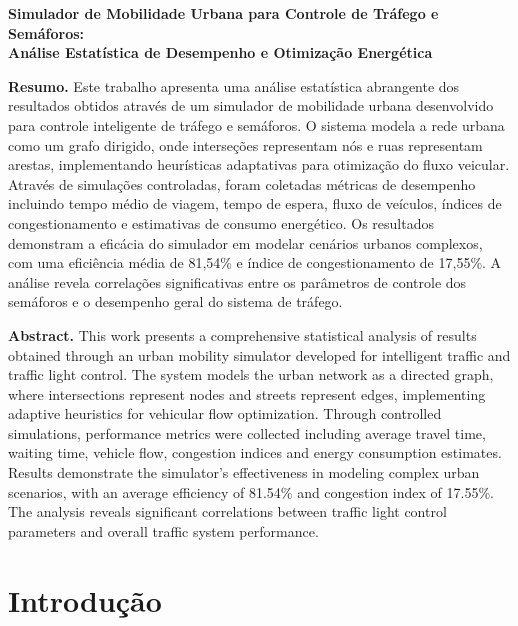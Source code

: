 \documentclass[12pt,a4paper]{article}
\begin{document}
\begin{center}
{\fontsize{12}{14.4}\selectfont\bfseries
Simulador de Mobilidade Urbana para Controle de Tráfego e Semáforos: \\
Análise Estatística de Desempenho e Otimização Energética}
\end{center}

\vspace{12pt}

\noindent\textbf{Resumo.} Este trabalho apresenta uma análise estatística abrangente dos resultados obtidos através de um simulador de mobilidade urbana desenvolvido para controle inteligente de tráfego e semáforos. O sistema modela a rede urbana como um grafo dirigido, onde interseções representam nós e ruas representam arestas, implementando heurísticas adaptativas para otimização do fluxo veicular. Através de simulações controladas, foram coletadas métricas de desempenho incluindo tempo médio de viagem, tempo de espera, fluxo de veículos, índices de congestionamento e estimativas de consumo energético. Os resultados demonstram a eficácia do simulador em modelar cenários urbanos complexos, com uma eficiência média de 81,54\% e índice de congestionamento de 17,55\%. A análise revela correlações significativas entre os parâmetros de controle dos semáforos e o desempenho geral do sistema de tráfego.

\vspace{6pt}

\noindent\textbf{Abstract.} This work presents a comprehensive statistical analysis of results obtained through an urban mobility simulator developed for intelligent traffic and traffic light control. The system models the urban network as a directed graph, where intersections represent nodes and streets represent edges, implementing adaptive heuristics for vehicular flow optimization. Through controlled simulations, performance metrics were collected including average travel time, waiting time, vehicle flow, congestion indices and energy consumption estimates. Results demonstrate the simulator's effectiveness in modeling complex urban scenarios, with an average efficiency of 81.54\% and congestion index of 17.55\%. The analysis reveals significant correlations between traffic light control parameters and overall traffic system performance.

\vspace{12pt}

\section{Introdução}
\end{document}
